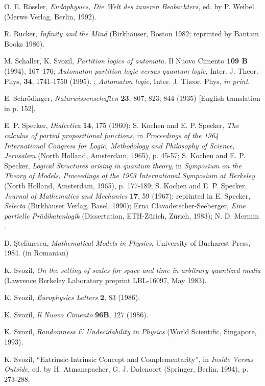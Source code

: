 \begin{thebibliography}{99}
 O. E. R\"ossler,
 {\sl Endophysics, Die Welt des inneren Beobachters},
 ed. by P. Weibel (Merwe Verlag, Berlin, 1992).


 R. Rucker, {\sl Infinity and the Mind} (Birkh\"auser, Boston 1982;
 reprinted by Bantam Books 1986).

M. Schaller, K. Svozil, {\it Partition logics of
automata.} Il Nuovo Cimento {\bf 109 B} (1994), 167--176;
{\it Automaton partition logic versus quantum logic,}
 Inter. J. Theor. Phys,  {\bf 34}, 1741-1750 (1995). ;
{\it Automaton logic,}
 Inter. J. Theor. Phys, {\it in print}.

E. Schr\"odinger,
{\sl Naturwissenschaften} {\bf 23}, 807; 823; 844 (1935) [English
translation             in
 \cite{wheeler-Zurek:83}
 p. 152].

E. P. Specker, {\sl Dialectica} {\bf 14}, 175 (1960);
S. Kochen and E. P. Specker,
{\sl The calculus of partial propositional functions,} in
{\sl Proceedings of the 1964 International Congress for Logic,
Methodology and Philosophy of Science, Jerusalem} (North Holland,
Amsterdam, 1965), p. 45-57;
S. Kochen and E. P. Specker,
{\sl Logical Structures arising in quantum theory}, in
{\sl Symposium on the Theory of Models, Proceedings of the
1963 International Symposium at Berkeley}
(North Holland, Amsterdam, 1965), p. 177-189;
S. Kochen and E. P. Specker,
{\sl Journal of Mathematics and Mechanics} {\bf 17}, 59 (1967);
reprinted in
E. Specker, {\sl Selecta} (Birkh\"auser Verlag, Basel, 1990);
Erna Clavadetscher-Seeberger, {\it Eine partielle Pr\"adikatenlogik}
(Dissertation, ETH-Z\"urich, Z\"urich, 1983);
N. D. Mermin \cite{mermin}.

  D. \c Stef\u anescu, {\it Mathematical Models in Physics},
 University of Bucharest Press, 1984. (in Romanian)


 K. Svozil,
 {\sl On the setting of scales for space and time in arbitrary
 quantized media}  (Lawrence Berkeley Laboratory preprint
 LBL-16097, May 1983).


K. Svozil,
{\sl Europhysics Letters} {\bf 2}, 83 (1986).


K. Svozil,
 {\sl Il Nuovo Cimento} {\bf 96B}, 127 (1986).


K. Svozil,
{\sl Randomness \& Undecidability in Physics}
(World Scientific, Singapore, 1993).

 K. Svozil,
``Extrinsic-Intrinsic Concept and Complementarity'',
in {\em Inside Versus Outside}, ed. by H. Atmanspacher,
G. J. Dalenoort
(Springer, Berlin, 1994),
p. 273-288.


\end{thebibliography}
